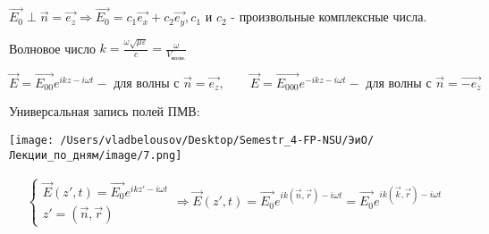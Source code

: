 \documentclass[12pt, a4paper]{report}
\begin{document}
\( \vec{E_0 } \perp \vec{n} = \vec{e_z} \Rightarrow \vec{E_0}=c_1 \vec{e_x}+ c_2 \vec{e_y}, c_1 \text{ и } c_2   \) - произвольные комплексные числа. 

\begin{definition}
    Волновое число \( k = \frac{\omega \sqrt{ \mu \varepsilon}}{c} = \frac{\omega}{V_{\text{волн.} } }   \) 
\end{definition}

\[ \displaystyle \vec{E}= \vec{E_{00}}e^{ikz- i \omega t } - \text{ для волны с } \vec{n} = \vec{e_z}, \qquad \vec{E}= \vec{E_{000}}e^{-ikz- i \omega t } - \text{ для волны с } \vec{n} = \vec{-e_z}  \] 

Универсальная запись полей ПМВ: 

\begin{center}
    \texttt{[image: /Users/vladbelousov/Desktop/Semestr\_4-FP-NSU/ЭиО/Лекции\_по\_дням/image/7.png]}
\end{center}

\[ \begin{aligned}
    \begin{cases}
        \vec{E}( z', t)= \vec{E_0 }e^{ikz' - i \omega t } \\  
        z'= (\vec{n}, \vec{r})
    \end{cases}
    \Rightarrow
    \vec{E}( z', t)= \vec{E_0}e^{ik(\vec{n}, \vec{r}) - i \omega t }= \vec{E_0}e^{ik(\vec{k}, \vec{r}) - i \omega t }
\end{aligned} \] 

\ifdefined\mainfile
\else
    
\end{document}
